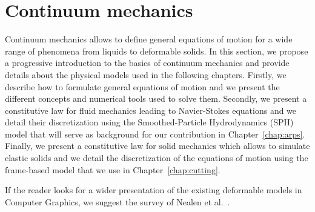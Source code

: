 \section{Continuum mechanics}

Continuum mechanics allows to define general equations of motion for a wide range of phenomena from liquids to deformable solids. 
In this section, we propose a progressive introduction to the basics of continuum mechanics and provide details about the physical models used in the following chapters. 
Firstly, we describe how to formulate general equations of motion and we present the different concepts and numerical tools used to solve them.
Secondly, we present a constitutive law for fluid mechanics leading to Navier-Stokes equations and we detail their discretization using the Smoothed-Particle Hydrodynamics (SPH) model that will serve as background for our contribution in Chapter~\ref{chap:arps}.
Finally, we present a constitutive law for solid mechanics which allows to simulate elastic solids and we detail the discretization of the equations of motion using the frame-based model that we use in Chapter~\ref{chap:cutting}.

If the reader looks for a wider presentation of the existing deformable models in Computer Graphics, we suggest the survey of Nealen et al.~\cite{Nealen2006}.
%

